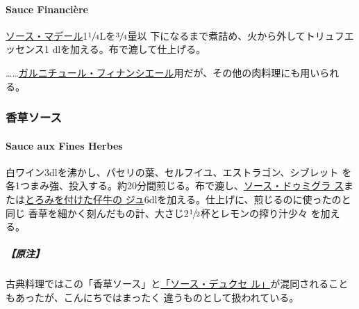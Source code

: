 \documentclass[twoside,12Q,b5j]{escoffierltjsbook}
\renewcommand{\ldots}{…}
\newenvironment{recette}{\begin{small}\begin{spacing}{1}\begin{multicols}{2}}{\end{multicols}\end{spacing}\end{small}}
\begin{document}
\begin{recette}
\paragraph{Sauce Financière}\label{sauce-financiere}


\protect\hyperlink{sauce-madere}{ソース・マデール}1\(\sfrac{1}{4}\)Lを\(\sfrac{3}{4}\)量以
下になるまで煮詰め、火から外してトリュフエッセンス1
dlを加える。布で漉して仕上げる。

\ldots{}\ldots{}\protect\hyperlink{garniture-financiere}{ガルニチュール・フィナンシエール}用だが、その他の肉料理にも用いられる。

\vspace*{1.7\zw}

\subsubsection{香草ソース}\label{ux9999ux8349ux30bdux30fcux30b9}

\paragraph{Sauce aux Fines Herbes}\label{sauce-aux-fines-herbes}


白ワイン3dlを沸かし、パセリの葉、セルフイユ、エストラゴン、シブレット
を各1つまみ強、投入する。約20分間煎じる。布で漉し、\protect\hyperlink{sauce-demi-glace}{ソース・ドゥミグラ
ス}または\protect\hyperlink{jus-de-veau-lie}{とろみを付けた仔牛の
ジュ}6dlを加える。仕上げに、煎じるのに使ったのと同じ
香草を細かく刻んだもの計、大さじ2\(\sfrac{1}{2}\)杯とレモンの搾り汁少々
を加える。

\subparagraph{【原注】}\label{ux539fux6ce8-1}

古典料理ではこの「香草ソース」と\protect\hyperlink{sauce-duxelles}{「ソース・デュクセ
ル」}が混同されることもあったが、こんにちではまったく
違うものとして扱われている。

\vspace*{1.7\zw}


\end{recette}
\end{document}
